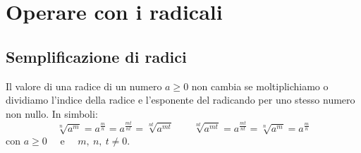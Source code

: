 \begin{comment}
In generale si dà la seguente
\begin{definizione}{}{}
Si dice \textbf{potenza a esponente razionale} \(\frac m n\) di un numero reale
positivo \(a\) l'espressione:
\(a^{\frac m n}=\sqrt[n]{a^m}=\left(\sqrt[n]a\right)^m\) con 
\(\frac m n\in \Q\).
\end{definizione}

Perché abbiamo dovuto imporre la condizione che~\(a\) sia un numero positivo?
Partiamo dall'espressione \(a^{\frac 1 n}\) con \(n\in \N-\{0\}\), 
se \(n\) è dispari la potenza \(a^{\frac 1 n}\) è sempre definita per ogni 
valore 
della base \(a\), mentre se è pari \(a^{\frac 1 n}\) è definita solo 
per \(a{\geqslant}0\).

Nel caso generale \(a^{\frac m n}\) con \(\frac m n\in \Q\) 
la formula \(a^{\frac m n}=\left(\sqrt[n]a\right)^m\) è falsa se \(a<0\).

Consideriamo il seguente esempio:
\((-2)^{\frac 6 6}=\left[(-2)^{\frac 1 
6}\right]^6=\left(\sqrt[6]{-2}\right)^6\) 
non è definita nei numeri reali perché non esiste la radice sesta di un 
numero 
negativo.
Tuttavia possiamo anche scrivere 

\[(-2)^{\frac 6 6}=\left[(-2)^6\right]^{\frac 1 6}=(64)^{\frac 1 6}=
\sqrt[6]{64}=2.\]

Arriviamo pertanto a due risultati differenti.

Per estendere la definizione al caso di basi negative sarebbe necessario 
stabilire un ordine di priorità delle operazioni ma ciò andrebbe contro la 
proprietà commutativa del prodotto degli esponenti di una potenza di 
potenza.

\ref{ese:2.18}, 

\end{comment}

\section{Operare con i radicali}
\label{sec:radicali_operare}

\subsection{Semplificazione di radici}

\begin{teorema}{}{}
Il valore di una radice di un numero \(a \geqslant 0\) non cambia se 
moltiplichiamo o dividiamo l'indice della radice e l'esponente del 
radicando per uno stesso numero non nullo. 
In simboli: 
\[\sqrt[n]{a^m}=a^{\frac{m}{n}}=a^{\frac{mt}{nt}}=\sqrt[nt]{a^{mt}} \qquad
  \sqrt[nt]{a^{mt}}=a^{\frac{mt}{nt}}=\sqrt[n]{a^m}=a^{\frac{m}{n}}\]
con \(a\geqslant 0\) ~~e~~ \(m,~n,~t \neq 0\).
\end{teorema}

